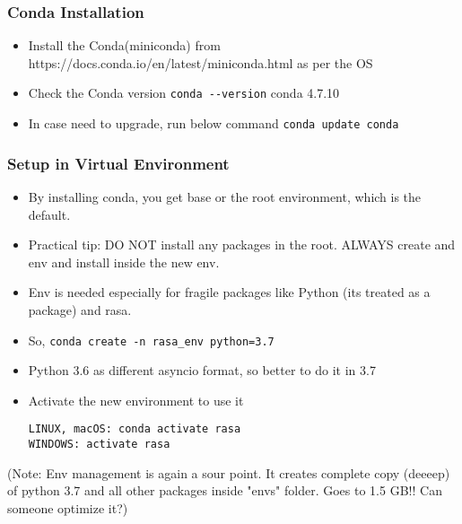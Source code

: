  \begin{frame}[fragile]\frametitle{Conda Installation}
\begin{itemize}
\item Install the Conda(miniconda) from https://docs.conda.io/en/latest/miniconda.html as per the OS
\item Check the Conda version \lstinline|conda --version| conda 4.7.10
\item In case need to upgrade, run below command \lstinline|conda update conda|
\end{itemize}
\end{frame}

 \begin{frame}[fragile]\frametitle{Setup in Virtual Environment}
\begin{itemize}
\item By installing conda, you get base or the root environment, which is the default.
\item Practical tip: DO NOT install any packages in the root. ALWAYS create and env and install inside the new env.
\item Env is needed especially for fragile packages like Python (its treated as a package) and rasa.
\item So, \lstinline|conda create -n rasa_env python=3.7| 
\item Python 3.6 as different asyncio format, so better to do it in 3.7
\item Activate the new environment to use it
\begin{lstlisting}
LINUX, macOS: conda activate rasa
WINDOWS: activate rasa
\end{lstlisting}
\end{itemize}

(Note: Env management is again a sour point. It creates complete copy (deeeep) of python 3.7 and all other packages inside "envs" folder. Goes to 1.5 GB!! Can someone optimize it?)
\end{frame}

